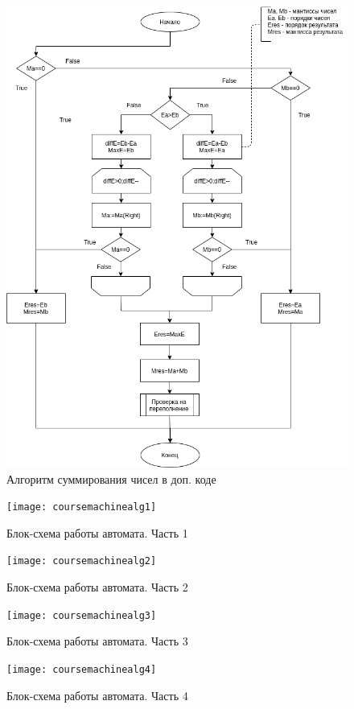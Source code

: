 \documentclass[a4paper,14pt]{extarticle}
\begin{document}
\begin{figure}[h!]
	\centering
	\includegraphics[width=0.8\linewidth]{images/course_algorithm_sum}
	\caption{Алгоритм суммирования чисел в доп. коде}
	\label{fig:coursealgorithmsum}
\end{figure}

\newpage
\begin{figure}[h!]
	\centering
	\texttt{[image: coursemachinealg1]}
	\caption {Блок-схема работы автомата. Часть 1}
	\label{fig:coursealgorithmmachine1}
\end{figure}

\newpage
\begin{figure}[h!]
	\centering
	\texttt{[image: coursemachinealg2]}
	\caption {Блок-схема работы автомата. Часть 2}
	\label{fig:coursealgorithmmachine2}
\end{figure}
\newpage


\newpage
\begin{figure}[h!]
	\centering
	\texttt{[image: coursemachinealg3]}
	\caption {Блок-схема работы автомата. Часть 3}
	\label{fig:coursealgorithmmachine3}
\end{figure}


\newpage
\begin{figure}[h!]
	\centering
	\texttt{[image: coursemachinealg4]}
	\caption {Блок-схема работы автомата. Часть 4}
	\label{fig:coursealgorithmmachine4}
\end{figure}
\newpage
\end{document}
